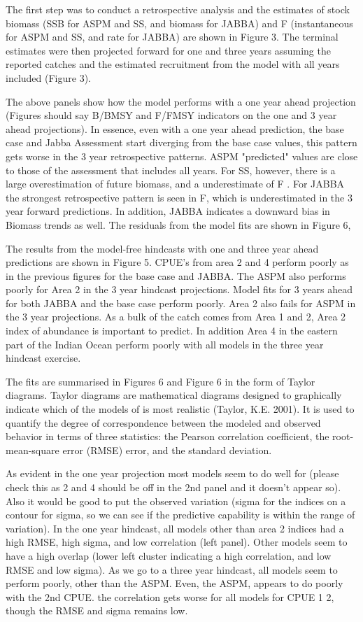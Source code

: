 The first step was to conduct a retrospective analysis and the estimates of stock biomass (SSB for ASPM and SS, and biomass for JABBA) and F (instantaneous for ASPM and SS, and rate for JABBA) are shown in Figure 3. The terminal estimates were then projected forward for one and
three years assuming the reported catches and the estimated recruitment from the model with all years included (Figure 3).

The above panels show how the model performs with a one year ahead projection (Figures should say B/BMSY and F/FMSY indicators on the one and 3 year ahead projections). In essence, even with a one year ahead prediction, the base case and Jabba Assessment start diverging from the base case values, this pattern gets
worse in the 3 year retrospective patterns.
ASPM "predicted" values are close to those of the assessment that includes all years. For SS, however, there is a large overestimation of future biomass, and a underestimate of F . For JABBA
the strongest retrospective pattern is seen in F, which is underestimated in the 3 year forward predictions. In addition, JABBA indicates a downward bias in Biomass trends as well.
The residuals from the model fits are shown in Figure 6, 

The results from the model-free hindcasts with one and three year ahead predictions are shown
in Figure 5. CPUE’s from area 2 and 4 perform poorly as in the previous figures for the base
case and JABBA. The ASPM also performs poorly for Area 2 in the 3 year hindcast projections.
Model fits for 3 years ahead for both JABBA and the base case perform poorly. Area 2 also fails
for ASPM in the 3 year projections. As a bulk of the catch comes from Area 1 and 2, Area 2 index
of abundance is important to predict. In addition Area 4 in the eastern part of the Indian Ocean
perform poorly with all models in the three year hindcast exercise.

The fits are summarised in Figures 6 and Figure 6 in the form of Taylor diagrams. Taylor diagrams are mathematical diagrams designed to graphically indicate which of the models of is most realistic (Taylor, K.E. 2001). It is used to quantify the degree of correspondence between the modeled and observed behavior in terms of three statistics: the Pearson correlation
coefficient, the root-mean-square error (RMSE) error, and the standard deviation. 

As evident in the one year projection most models seem to do well for (please check this as 2 and 4 should be off in the 2nd panel and it doesn’t appear so). Also it would be good to put the observed variation
(sigma for the indices on a contour for sigma, so we can see if the predictive capability is within the range of variation). In the one year hindcast, all models other than area 2 indices had a high RMSE, high sigma, and low correlation (left panel). Other models seem to have a high overlap (lower left cluster indicating a high correlation, and low RMSE and low sigma). As we go to a three year hindcast,
all models seem to perform poorly, other than the ASPM. Even, the ASPM, appears to do poorly with the 2nd CPUE. the correlation gets worse for all models for CPUE 1 2, though the RMSE and sigma remains low.

